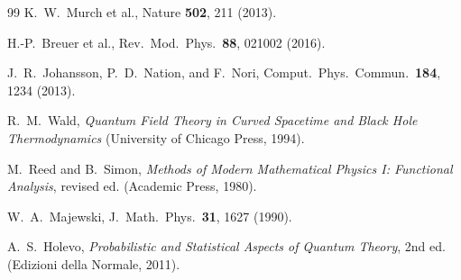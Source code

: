 \documentclass[11pt,a4paper]{article}
\theoremstyle{definition}
\theoremstyle{remark}
\begin{document}
\begin{thebibliography}{99}
K.~W.~Murch et al., Nature \textbf{502}, 211 (2013).

H.-P.~Breuer et al., Rev.\ Mod.\ Phys.\ \textbf{88}, 021002 (2016).

J.~R.~Johansson, P.~D.~Nation, and F.~Nori, Comput.\ Phys.\ Commun.\ 
\textbf{184}, 1234 (2013).

R.~M.~Wald, \emph{Quantum Field Theory in Curved Spacetime and Black Hole 
Thermodynamics} (University of Chicago Press, 1994).

M.~Reed and B.~Simon, \emph{Methods of Modern Mathematical Physics I: 
Functional Analysis}, revised ed. (Academic Press, 1980).

W.~A.~Majewski, J.\ Math.\ Phys.\ \textbf{31}, 1627 (1990).

A.~S.~Holevo, \emph{Probabilistic and Statistical Aspects of Quantum 
Theory}, 2nd ed. (Edizioni della Normale, 2011).

\end{thebibliography}
\end{document}
